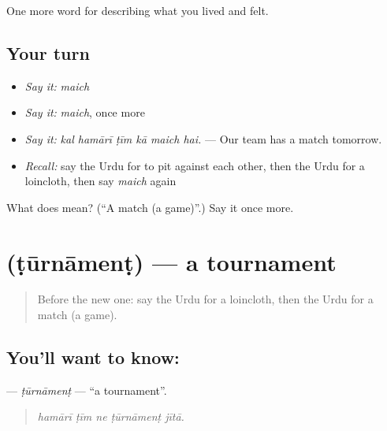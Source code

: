 \begin{grammarlens}[title={What you've built}]
One more word for describing what you lived and felt.
\end{grammarlens}

\subsection*{Your turn}
\begin{itemize}
\raggedright
  \item \emph{Say it:} \emph{maich}
  \item \emph{Say it:} \emph{maich}, once more
  \item \emph{Say it:} \emph{kal hamārī ṭīm kā maich hai.} — Our team has a match tomorrow.
  \item \emph{Recall:} say the Urdu for to pit against each other, then the Urdu for a loincloth, then say \emph{maich} again
\end{itemize}

\begin{tcolorbox}[breakable,colback=teal!4,colframe=teal!35!black,title={Before you move on}]
What does  mean? (\textquotedblleft{}A match (a game)\textquotedblright{}.) Say it once more.
\end{tcolorbox}
\section[\texorpdfstring{\ur{ٹورنامنٹ} (ṭūrnāmenṭ)}{ٹورنامنٹ (ṭūrnāmenṭ)}]{ (ṭūrnāmenṭ) — a tournament}

\label{lesson:UR-C521-turnament}



\begin{quote}
Before the new one: say the Urdu for a loincloth, then the Urdu for a match (a game).
\end{quote}

\subsection*{You'll want to know: }
\textbf{} — \emph{ṭūrnāmenṭ} — \textquotedblleft{}a tournament\textquotedblright{}.

\begin{quote}
    
\end{quote}

\begin{quote}
\emph{hamārī ṭīm ne ṭūrnāmenṭ jītā.}
\end{quote}

